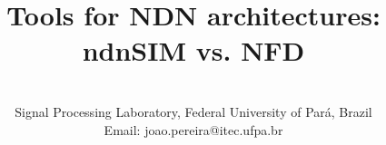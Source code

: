 \documentclass[11pt,conference]{./IEEEtran}
\newcommand{\mytitle}{Tools for NDN architectures: ndnSIM vs. NFD}
\begin{document}
 

\title{\mytitle}

                               
\author{
 \\
 Signal Processing Laboratory, Federal University of Par\'{a}, Brazil\\
Email: joao.pereira@itec.ufpa.br
}


\maketitle
\end{document}
